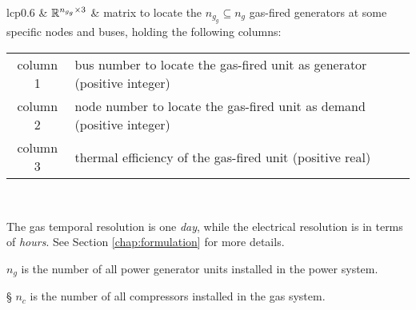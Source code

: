 \begin{appendix}
\begin{table}[!ht]
\begin{threeparttable}
\begin{tabular}{lcp{}}
			 & $\mathbb{R}^{n_{g_g}\times 3}$	& matrix to locate the $n_{g_g} \subseteq n_g$ gas-fired generators at some specific nodes and buses, holding the following columns:\tnote{\ddag}
			\begin{tabular}{c @{ -- } p{}}
				column 1  & bus number to locate the gas-fired unit as generator (positive integer)\\
				column 2  & node number to locate the gas-fired unit as demand (positive integer)\\
				column 3  & thermal efficiency of the gas-fired unit (positive real)\\
			\end{tabular}\\			
			\bottomrule
		\end{tabular}
		\begin{tablenotes}
			\scriptsize
			\item [\dag] {The gas temporal resolution is one \textit{day}, while the electrical resolution is in terms of \textit{hours}. See Section \ref{chap:formulation} for more details.}
			\item [\ddag] {$n_g$ is the number of all power generator units installed in the power system.}
			\item[\S] {$n_c$ is the number of all compressors installed in the gas system.} 
		\end{tablenotes}
	\end{threeparttable}
\end{table}

\end{appendix}